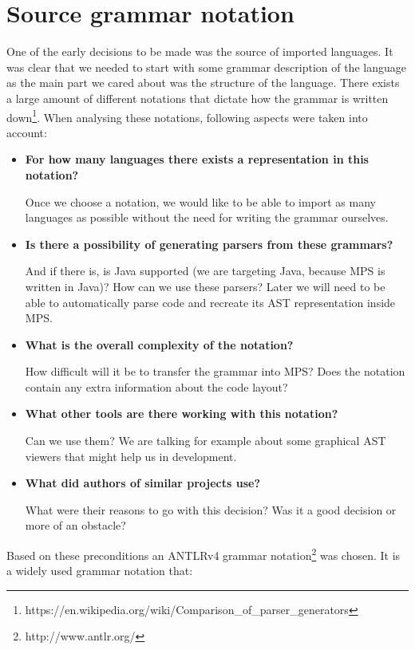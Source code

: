 \chapter{Source grammar notation}

One of the early decisions to be made was the source of imported languages. It was clear that we needed to start with some grammar description of the language as the main part we cared about was the structure of the language. There exists a large amount of different notations that dictate how the grammar is written down\footnote{https://en.wikipedia.org/wiki/Comparison{\_}of{\_}parser{\_}generators}. When analysing these notations, following aspects were taken into account:

\begin{itemize}
	\item \textbf{For how many languages there exists a representation in this notation?} 
	
	Once we choose a notation, we would like to be able to import as many languages as possible without the need for writing the grammar ourselves.
	
	\item \textbf{Is there a possibility of generating parsers from these grammars?} 
	
	And if there is, is Java supported (we are targeting Java, because MPS is written in Java)? How can we use these parsers? Later we will need to be able to automatically parse code and recreate its AST representation inside MPS. 
	
	\item \textbf{What is the overall complexity of the notation?}
	
	How difficult will it be to transfer the grammar into MPS? Does the notation contain any extra information about the code layout?
	
	\item \textbf{What other tools are there working with this notation?}
	
	Can we use them? We are talking for example about some graphical AST viewers that might help us in development.
	
	\item \textbf{What did authors of similar projects use?}
	
	What were their reasons to go with this decision? Was it a good decision or more of an obstacle?
\end{itemize}

Based on these preconditions an ANTLRv4 grammar notation\footnote{http://www.antlr.org/} was chosen. It is a widely used grammar notation that:

